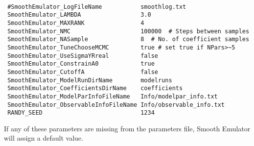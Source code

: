 \documentclass[main.tex]{subfiles}
\begin{document}
{\tt
\begin{verbatim}
 #SmoothEmulator_LogFileName           smoothlog.txt
 SmoothEmulator_LAMBDA                 3.0
 SmoothEmulator_MAXRANK                4
 SmoothEmulator_NMC                    100000  # Steps between samples 
 SmoothEmulator_NASample               8  # No. of coefficient samples
 SmoothEmulator_TuneChooseMCMC         true # set true if NPars>~5
 SmoothEmulator_UseSigmaYRreal         false 
 SmoothEmulator_ConstrainA0            true
 SmoothEmulator_CutoffA                false
 SmoothEmulator_ModelRunDirName        modelruns
 SmoothEmulator_CoefficientsDirName    coefficients
 SmoothEmulator_ModelParInfoFileName   Info/modelpar_info.txt
 SmoothEmulator_ObservableInfoFileName Info/observable_info.txt
 RANDY_SEED                            1234
\end{verbatim}
}
If any of these parameters are missing from the parameters file, Smooth Emulator will assign a default value.
\end{document}
